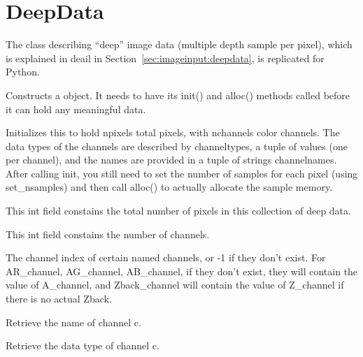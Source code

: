 \section{DeepData}
\label{sec:pythondeepdata}

The \DeepData class describing ``deep'' image data (multiple depth
sample per pixel), which is explained in deail in
Section~\ref{sec:imageinput:deepdata}, is replicated for Python.

Constructs a \DeepData object. It needs to have its {\cf init()} and
{\cf alloc()} methods called before it can hold any meaningful data.
\apiend

Initializes this \DeepData to hold {\cf npixels} total pixels, with
{\cf nchannels} color channels. The data types of the channels are
described by {\cf channeltypes}, a tuple of \TypeDesc values (one per
channel), and the names are provided in a tuple of {\cf string}s
{\cf channelnames}. After calling {\cf init}, you still need to set the number of
samples for each pixel (using {\cf set_nsamples}) and then call {\cf alloc()}
to actually allocate the sample memory.
\apiend

This {\cf int} field constains the total number of pixels in this
collection of deep data.
\apiend

This {\cf int} field constains the number of channels.
\apiend

\NEW %
The channel index of certain named channels, or -1 if they don't exist. For
{\cf AR_channel}, {\cf AG_channel}, {\cf AB_channel}, if they don't exist,
they will contain the value of {\cf A_channel}, and {\cf Zback_channel} will
contain the value of {\cf Z_channel} if there is no actual {\cf Zback}.
\apiend

Retrieve the name of channel {\cf c}.
\apiend

Retrieve the data type of channel {\cf c}.
\apiend

